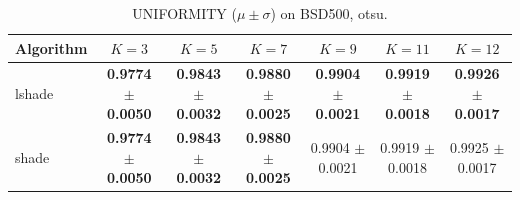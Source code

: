 \begin{table}[htbp]
\centering
\caption{UNIFORMITY ($\mu \pm \sigma$) on BSD500, otsu.}
\label{tab:exp1-otsu-uniformity}
\begin{tabular}{lcccccc}
\toprule
Algorithm & $K=3$ & $K=5$ & $K=7$ & $K=9$ & $K=11$ & $K=12$ \\
\midrule
lshade & \textbf{0.9774 $\pm$ 0.0050} & \textbf{0.9843 $\pm$ 0.0032} & \textbf{0.9880 $\pm$ 0.0025} & \textbf{0.9904 $\pm$ 0.0021} & \textbf{0.9919 $\pm$ 0.0018} & \textbf{0.9926 $\pm$ 0.0017} \\
shade & \textbf{0.9774 $\pm$ 0.0050} & \textbf{0.9843 $\pm$ 0.0032} & \textbf{0.9880 $\pm$ 0.0025} & 0.9904 $\pm$ 0.0021 & 0.9919 $\pm$ 0.0018 & 0.9925 $\pm$ 0.0017 \\
\bottomrule
\end{tabular}
\end{table}